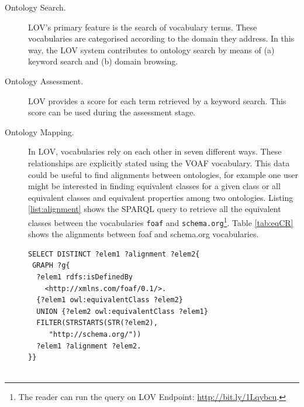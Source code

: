 \documentclass{iosart2c}
\begin{document}
\begin{description}

 \item [Ontology Search.] LOV's primary feature is the search of vocabulary terms. These vocabularies are categorised according to the domain they address. In this way, the LOV system contributes to ontology search by means of (a) keyword search and (b) domain browsing.
 \item [Ontology Assessment.] LOV provides a score for each term retrieved by a keyword search. This score can be used during the assessment stage.
 \item [Ontology Mapping.] In LOV, vocabularies rely on each other in seven different ways. These relationships are explicitly stated using the VOAF vocabulary. This data could be useful to find alignments between ontologies, for example one user might be interested in finding equivalent classes for a given class or all equivalent classes and equivalent properties among two ontologies. Listing \ref{list:alignment} shows the SPARQL query to retrieve all the equivalent classes between the vocabularies \texttt{foaf} and \texttt{schema.org}\footnote{The reader can run the query on LOV Endpoint: \url{http://bit.ly/1Lqybcu}.}. Table \ref{tab:eqCR} shows the alignments between foaf and schema.org vocabularies.
     
 \begin{lstlisting}[basicstyle=\tiny,float=htb,caption={SPARQL query asking for all the equivalent classes and properties between the vocabularies foaf and schema.},label=list:alignment, language=turtle]
SELECT DISTINCT ?elem1 ?alignment ?elem2{
 GRAPH ?g{
  ?elem1 rdfs:isDefinedBy 
    <http://xmlns.com/foaf/0.1/>.
  {?elem1 owl:equivalentClass ?elem2}
  UNION {?elem2 owl:equivalentClass ?elem1}
  FILTER(STRSTARTS(STR(?elem2), 
     "http://schema.org/"))
  ?elem1 ?alignment ?elem2.
}}
	
	\end{lstlisting}
	
 \begin{table}[h!tb]
\caption{Equivalent classes and properties between foaf and schema.org.}
\label{tab:eqCR}
\end{table}
    

\end{description}
\end{document}
